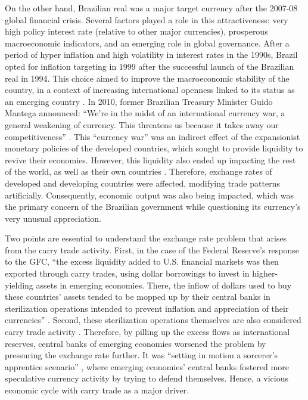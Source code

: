 \documentclass[a4paper, twoside]{templates/ociamthesis}
\begin{document}
On the other hand, Brazilian real was a major target currency after the 2007-08 global financial crisis. Several factors played a role in this attractiveness: very high policy interest rate (relative to other major currencies), prosperous macroeconomic indicators, and an emerging role in global governance. After a period of hyper inflation and high volatility in interest rates in the 1990s, Brazil opted for inflation targeting in 1999 \autocite{barbosa-filho2009} after the successful launch of the Brazilian real in 1994. This choice aimed to improve the macroeconomic stability of the country, in a context of increasing international openness linked to its status as an emerging country \autocite{artus2004,libanio2010}. In 2010, former Brazilian Treasury Minister Guido Mantega announced: ``We're in the midst of an international currency war, a general weakening of currency. This threatens us because it takes away our competitiveness'' \autocite{financialtimes2010}. This ``currency war'' was an indirect effect of the expansionist monetary policies of the developed countries, which sought to provide liquidity to revive their economies. However, this liquidity also ended up impacting the rest of the world, as well as their own countries \autocite{grabel2018}. Therefore, exchange rates of developed and developing countries were affected, modifying trade patterns artificially. Consequently, economic output was also being impacted, which was the primary concern of the Brazilian government while questioning its currency's very unusual appreciation.

Two points are essential to understand the exchange rate problem that arises from the carry trade activity. First, in the case of the Federal Reserve's response to the GFC, ``the excess liquidity added to U.S. financial markets was then exported through carry trades, using dollar borrowings to invest in higher-yielding assets in emerging economies. There, the inflow of dollars used to buy these countries' assets tended to be mopped up by their central banks in sterilization operations intended to prevent inflation and appreciation of their currencies'' \autocite[ 11]{darista2018}. Second, these sterilization operations themselves are also considered carry trade activity \autocite{gabor2015}. Therefore, by pilling up the excess flows as international reserves, central banks of emerging economies worsened the problem by pressuring the exchange rate further. It was ``setting in motion a sorcerer's apprentice scenario'' \autocite[ 11]{darista2018}, where emerging economies' central banks fostered more speculative currency activity by trying to defend themselves. Hence, a vicious economic cycle with carry trade as a major driver.
\end{document}
